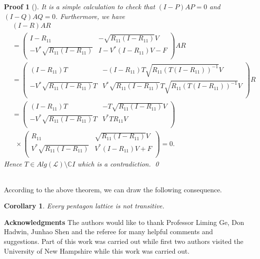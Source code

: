 \documentclass{jaums}
\theoremstyle{thmit} %
\newtheorem{corollary}[theorem]{Corollary}
\theoremstyle{thmrm} %
\newtheorem*{oldproof}{Proof}
\renewenvironment{proof}[1][{}]{\begin{oldproof}[#1]}{\qed\end{oldproof}}
\begin{document}
\begin{proof}
It is a simple calculation to check that $(I-P)AP=0$ and $(I-Q)AQ=0$.
Furthermore, we have
\begin{align*}
&(I-R)AR\\
&=\left(
      \begin{array}{cc}
        I-R_{11} & -\sqrt{R_{11}(I-R_{11})}V  \\
        -V^{*}\sqrt{R_{11}(I-R_{11})} & I-V^{*}(I-R_{11})V-F \\
      \end{array}
    \right)AR\\
    &=\left(
      \begin{array}{cc}
        (I-R_{11})T & -(I-R_{11})T\sqrt{R_{11}(T(I-R_{11}))^{-1}}V  \\
        -V^{*}\sqrt{R_{11}(I-R_{11})}T &
V^{*}\sqrt{R_{11}(I-R_{11})}T\sqrt{R_{11}(T(I-R_{11}))^{-1}}V \\
      \end{array}
    \right)R\\
    &=\left(
      \begin{array}{cc}
        (I-R_{11})T & -T\sqrt{R_{11}(I-R_{11})}V  \\
        -V^{*}\sqrt{R_{11}(I-R_{11})}T & V^{*}TR_{11}V \\
      \end{array}
    \right)\\
     & \  \  \times\left(
      \begin{array}{cc}
        R_{11} & \sqrt{R_{11}(I-R_{11})}V  \\
        V^{*}\sqrt{R_{11}(I-R_{11})} & V^{*}(I-R_{11})V+F \\
      \end{array}
    \right)=0.
\end{align*}
Hence $T\in Alg(\mathcal{L})\setminus\mathbb{C}I$ which is a contradiction.
\end{proof}\\

According to the above theorem, we can draw the following consequence.

\begin{corollary} Every pentagon lattice is not transitive.
\end{corollary}

\noindent\textbf{Acknowledgments} The authors would like to thank Professor
Liming Ge, Don Hadwin, Junhao Shen and the referee for many helpful comments
and suggestions.
Part of this work was carried out while first two authors visited the University
of New Hampshire while this work was carried out.
\end{document}
